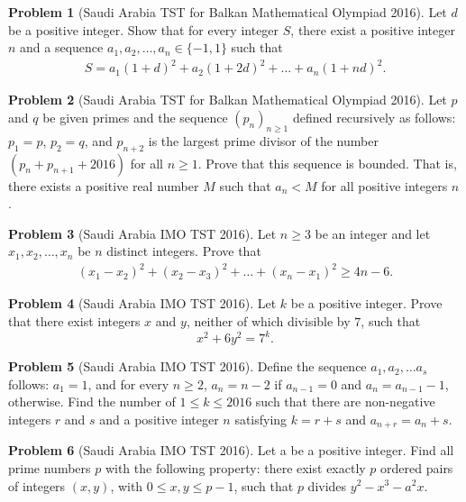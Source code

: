 \documentclass[]{article}
\theoremstyle{definition}
\newtheorem{problem}{Problem}
\begin{document}
\begin{problem}[Saudi Arabia TST for Balkan Mathematical Olympiad 2016]
	Let $d$ be a positive integer. Show that for every integer $S$, there exist a positive integer $n$ and a sequence $a_1, a_2,\dots , a_n \in \{−1, 1\}$ such that
		\begin{align*}
			S = a_1(1 + d)^2 + a_2(1 + 2d)^2 + \dots + a_n(1 + nd)^2.
		\end{align*}
\end{problem}


\begin{problem}[Saudi Arabia TST for Balkan Mathematical Olympiad 2016]
	Let $p$ and $q$ be given primes and the sequence $(p_n)_{n\geq 1}$ defined recursively as follows: $p_1 = p$, $p_2 = q$, and $p_{n+2}$ is the largest prime divisor of the number $(p_n + p_{n+1} + 2016)$ for all $n \geq 1$. Prove that this sequence is bounded. That is, there exists a positive real number $M$ such that $a_n < M$ for all positive integers $n$.
\end{problem}



\begin{problem}[Saudi Arabia IMO TST 2016]
	Let $n \geq 3$ be an integer and let $x_1, x_2,\dots , x_n$ be $n$ distinct integers. Prove that
		\begin{align*}
			(x_1 - x_2)^2 +(x_2 - x_3)^2 + \dots+(x_n - x_1)^2 \geq 4n - 6.
		\end{align*}
\end{problem}


\begin{problem}[Saudi Arabia IMO TST 2016]
	Let $k$ be a positive integer. Prove that there exist integers $x$ and $y$, neither of which divisible by $7$, such that $$x^2 + 6y^2 = 7^k.$$
\end{problem}



\begin{problem}[Saudi Arabia IMO TST 2016]
	Define the sequence $a_1, a_2,\dots a_s$ follows: $a_1 = 1$, and for every $n \geq 2$, $a_n = n - 2$ if $a_{n-1} = 0$ and $a_n = a_{n-1} - 1$, otherwise. Find the number of $1 \leq k \leq 2016$ such that there are non-negative integers $r$ and $s$ and a positive integer $n$ satisfying $k = r + s$ and $a_{n+r} = a_n + s.$
\end{problem}


\begin{problem}[Saudi Arabia IMO TST 2016]
	Let a be a positive integer. Find all prime numbers $p$ with the following property: there exist exactly $p$ ordered pairs of integers $(x, y)$, with $0 \leq x, y \leq p - 1$, such that $p$ divides $y^2 - x^3 - a^2x$.
\end{problem}
\end{document}
